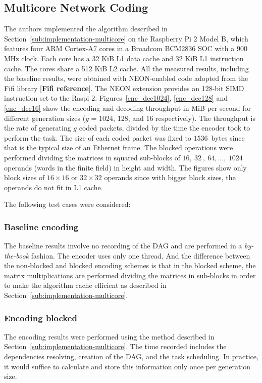 \subsection{Multicore Network Coding}
\label{subs:multicore-network-coding}

The authors implemented the algorithm described in
Section~\ref{sub:implementation-multicore} on the Raspberry Pi 2 Model B,
which features four ARM Cortex-A7 cores in a Broadcom BCM2836 \ac{SOC}
with a 900 MHz clock. Each core has a 32 KiB L1 data cache and 32 KiB
L1 instruction cache. The cores share a 512 KiB L2 cache. All the
measured results, including the baseline results, were obtained with
NEON-enabled code adopted from the Fifi library [\textbf{Fifi reference}].
The NEON extension provides an 128-bit \ac{SIMD} instruction set to the
\ac{Raspi} 2. Figures~\ref{enc_dec1024}, \ref{enc_dec128} and
\ref{enc_dec16} show the encoding and decoding throughput in MiB per
second for different generation sizes ($g$ = 1024, 128, and 16
respectively). The throughput is the rate of generating $g$ coded packets,
divided by the time the encoder took to perform the task. The size of
each coded packet was fixed to $1536$~bytes since that is the typical
size of an Ethernet frame. The blocked operations were performed dividing
the matrices in squared sub-blocks of $16,\ 32\ ,\ 64,\ldots,\ 1024$ operands
(words in the finite field) in height and width. The figures show only
block sizes of $16 \times 16$ or $32 \times 32$ operands since with bigger
block sizes, the operands do not fit in L1 cache.

The following test cases were considered:

\subsubsection{Baseline encoding}
The baseline results involve no recording of the
\ac{DAG} and are performed in a \emph{by-the-book} fashion. The encoder uses
only one thread. And the difference between the non-blocked and blocked
encoding schemes is that in the blocked scheme, the matrix multiplications are
performed dividing the matrices in sub-blocks in order to make the algorithm
cache efficient as described in Section~\ref{sub:implementation-multicore}.

\subsubsection{Encoding blocked}
The encoding results were performed using the
method described in Section~\ref{sub:implementation-multicore}. The time
recorded includes the dependencies resolving, creation of the \ac{DAG},
and the task scheduling. In practice, it would suffice to calculate and
store this information only once per generation size.

